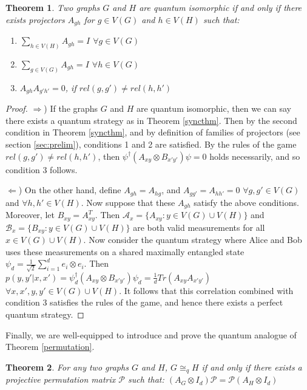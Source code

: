 \documentclass[12pt]{article}
\newtheorem{thm}{Theorem}[section]
\begin{document}
\begin{thm}
  \label{projqiso}
  Two graphs $G$ and $H$ are quantum isomorphic if and only if there
  exists projectors $A_{gh}$ for $g \in V(G)$ and $h \in V(H)$ such
  that:
  \begin{enumerate}
  \item $\sum_{h \in V(H)} A_{gh} = I$ $\forall g \in V(G)$
  \item $\sum_{g \in V(G)} A_{gh} = I$ $\forall h \in V(G)$
  \item $A_{gh}A_{g'h'} = 0$, if $rel(g, g') \neq rel(h, h')$
  \end{enumerate}
\end{thm}

\begin{proof}
$\Rightarrow$) If the graphs $G$ and $H$ are quantum isomorphic, then
  we can say there exists a quantum strategy as in Theorem
  \ref{syncthm}. Then by the second condition in Theorem
  \ref{syncthm}, and by definition of families of projectors (see
  section \ref{sec:prelim}), conditions 1 and 2 are satisfied. By the
  rules of the game $rel(g, g') \neq rel(h, h')$, then $\psi^{\dag}
  (A_{xy} \otimes B_{x'y'}) \psi = 0$ holds necessarily, and so
  condition 3 follows.

$\Leftarrow$) On the other hand, define $A_{gh} = A_{hg}$, and
  $A_{gg'} = A_{hh'} = 0$ $\forall g, g' \in V(G)$ and $\forall h, h'
  \in V(H)$. Now suppose that these $A_{gh}$ satisfy the above
  conditions. Moreover, let $B_{xy} = A_{xy}^T$. Then $\mathcal{A}_x =
  \{A_{xy}: y \in V(G) \cup V(H)\}$ and $\mathcal{B}_x = \{B_{xy}: y
  \in V(G) \cup V(H)\}$ are both valid measurements for all $x \in
  V(G) \cup V(H)$. Now consider the quantum strategy where Alice and
  Bob uses these measurements on a shared maximally entangled state
  $\psi_d = \frac{1}{\sqrt{2}} \sum_{i=1}^d e_i \otimes e_i$. Then
  $p(y, y'|x, x') = \psi^{\dag}_d (A_{xy} \otimes B_{x'y'}) \psi_d=
  \frac{1}{d}Tr(A_{xy}A_{x'y'})$ $\forall x, x', y, y' \in V(G) \cup
  V(H)$. It follows that this correlation combined with condition 3
  satisfies the rules of the game, and hence there exists a perfect
  quantum strategy.
\end{proof}

Finally, we are well-equipped to introduce and prove the quantum
analogue of Theorem \ref{permutation}.

\begin{thm}
  For any two graphs $G$ and $H$, $G \cong_q H$ if and only if there
  exists a projective permutation matrix $\mathcal{P}$ such that:
  $(A_G \otimes I_d)\mathcal{P} = \mathcal{P} (A_H \otimes I_d)$
\end{thm}
\end{document}
